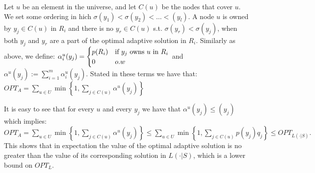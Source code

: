Let $u$ be an element in the universe, and let $C(u)$ be the nodes
that cover $u$. We set some ordering in hich $\sigma(y_{1})<\sigma(y_{2})<\ldots<(y_{l})$.
A node $u$ is owned by $y_{j}\in C(u)$ in $R_{i}$ and there is
no $y_{r}\in C(u)$ s.t. $\sigma(y_{r})<\sigma(y_{j})$, when both
$y_{j}$ and $y_{r}$ are a part of the optimal adaptive solution
in $R_{i}$. Similarly as above, we define: $\alpha_{i}^{u}(y_{j})=\begin{cases}
p(R_{i}) & \text{if \ensuremath{y_{j}} owns \ensuremath{u} in \ensuremath{R_{i}}}\\
0 & o.w
\end{cases}$ and $\alpha^{u}(y_{j}):=\sum_{i=1}^{m}\alpha_{i}^{u}(y_{j})$. Stated
in these terms we have that: $OPT_{A}=\sum_{u\in U}\min\left\{ 1,\sum_{j\in C(u)}\alpha^{u}(y_{j})\right\} $ 

It is easy to see that for every $u$ and every $y_{j}$ we have that
$\alpha^{u}(y_{j})\leq(y_{j})$ which implies: $OPT_{A}=\sum_{u\in U}\min\left\{ 1,\sum_{j\in C(u)}\alpha^{u}(y_{j})\right\} \leq\sum_{u\in U}\min\left\{ 1,\sum_{j\in C(u)}p(y_{j})q_{j}\right\} \leq OPT_{L(\cdot|S)}.$This
shows that in expectation the value of the optimal adaptive solution
is no greater than the value of its corresponding solution in $L(\cdot|S)$,
which is a lower bound on $OPT_{L}$.


